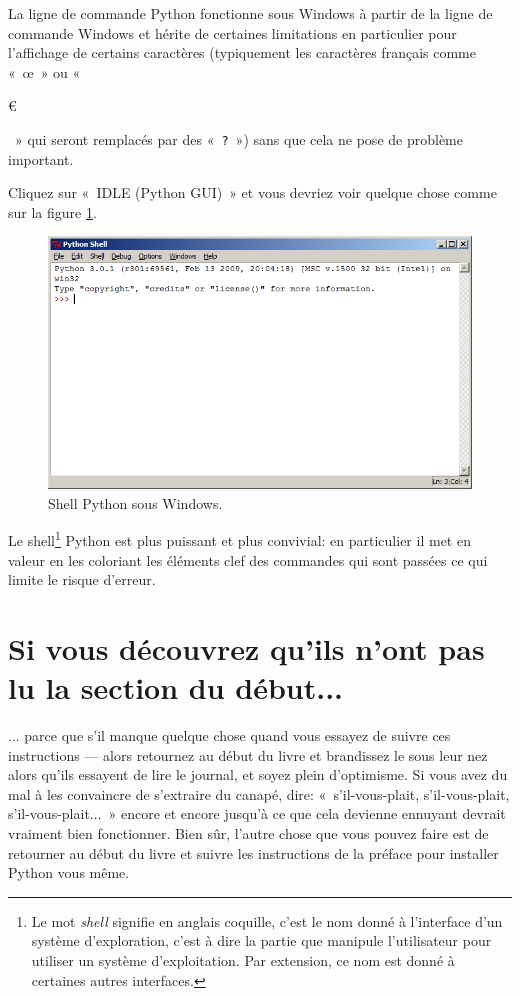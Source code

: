 La ligne de commande Python fonctionne sous Windows à partir de la ligne de commande Windows et hérite de certaines limitations en particulier pour l'affichage de certains caractères (typiquement les caractères français comme « œ » ou  « \begin{small}\euro\end{small} » qui seront remplacés par des « \texttt{?} ») sans que cela ne pose de problème important.

Cliquez sur « IDLE (Python GUI) » et vous devriez voir quelque chose comme sur la figure \ref{fig:shell}.

\begin{figure}[!ht]
\centering
\includegraphics[scale=0.6]{images/shell}
\caption{Shell Python sous Windows.}\label{fig:shell}
\end{figure}

Le shell\footnote{Le mot \emph{shell} signifie en anglais coquille, c'est le nom donné à l'interface d'un système d'exploration, c'est à dire la partie que manipule l'utilisateur pour utiliser un système d'exploitation. Par extension, ce nom est donné à certaines autres interfaces.} Python est plus puissant et plus convivial: en particulier il met en valeur en les coloriant les éléments clef des commandes qui sont passées ce qui limite le risque d'erreur.

\section*{Si vous découvrez qu'ils n'ont pas lu la section du début...}

... parce que s'il manque quelque chose quand vous essayez de suivre ces instructions --- alors retournez au début du livre et brandissez le sous leur nez alors qu'ils essayent de lire le journal, et soyez plein d'optimisme. Si vous avez du mal à les convaincre de s'extraire du canapé, dire: « s'il-vous-plait, s'il-vous-plait, s'il-vous-plait... » encore et encore jusqu'à ce que cela devienne ennuyant devrait vraiment bien fonctionner. Bien sûr, l'autre chose que vous pouvez faire est de retourner au début du livre et suivre les instructions de la préface pour installer Python vous même.

